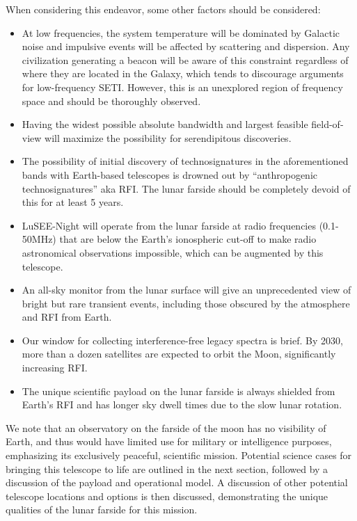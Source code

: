 When considering this endeavor, some other factors should be considered:
\begin{itemize}
    \item At low frequencies, the system temperature will be dominated by Galactic noise and impulsive events will be affected by scattering and dispersion. Any civilization generating a beacon will be aware of this constraint regardless of where they are located in the Galaxy, which tends to discourage arguments for low-frequency SETI.  However, this is an unexplored region of frequency space and should be thoroughly observed.
    \item Having the widest possible absolute bandwidth and largest feasible field-of-view will maximize the possibility for serendipitous discoveries.
    \item The possibility of initial discovery of technosignatures in the aforementioned bands with Earth-based telescopes is drowned out by ``anthropogenic technosignatures'' aka RFI.  The lunar farside should be completely devoid of this for at least 5 years.
   \item LuSEE-Night will operate from the lunar farside at radio frequencies (0.1-50MHz) that are below the Earth's ionospheric cut-off to make radio astronomical observations impossible, which can be augmented by this telescope.
    \item An all-sky monitor from the lunar surface will give an unprecedented view of bright but rare transient events, including those obscured by the atmosphere and RFI from Earth.
    \item Our window for collecting interference-free legacy spectra is brief. By 2030, more than a dozen satellites are expected to orbit the Moon, significantly increasing RFI.
    \item The unique scientific payload on the lunar farside is always shielded from Earth's RFI and has longer sky dwell times due to the slow lunar rotation.
\end{itemize}

We note that an observatory on the farside of the moon has no visibility of Earth, and thus would have limited use for military or intelligence purposes, emphasizing its exclusively peaceful, scientific mission. Potential science cases for bringing this telescope to life are outlined in the next section, followed by a discussion of the payload and operational model.  A discussion of other potential telescope locations and options is then discussed, demonstrating the unique qualities of the lunar farside for this mission.
